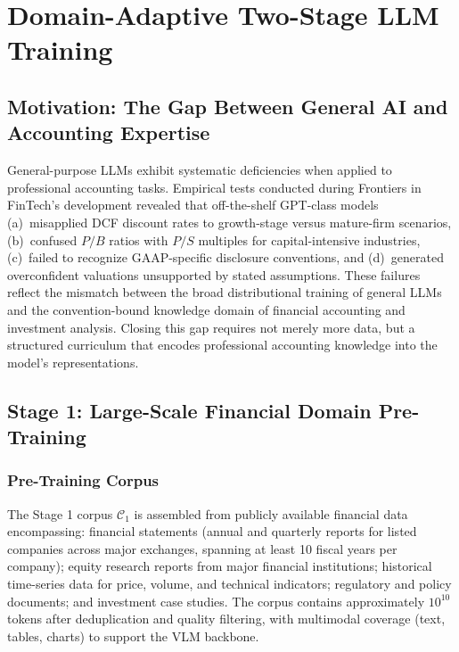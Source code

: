 \documentclass[12pt,letterpaper]{article}
\begin{document}
\section{Domain-Adaptive Two-Stage LLM Training}
\label{sec:innovation2}

\subsection{Motivation: The Gap Between General AI and Accounting Expertise}

General-purpose LLMs exhibit systematic deficiencies when applied to
professional accounting tasks.
Empirical tests conducted during Frontiers in FinTech's development revealed that
off-the-shelf GPT-class models (a)~misapplied DCF discount rates to
growth-stage versus mature-firm scenarios, (b)~confused $P/B$ ratios
with $P/S$ multiples for capital-intensive industries, (c)~failed to
recognize GAAP-specific disclosure conventions, and (d)~generated
overconfident valuations unsupported by stated assumptions.
These failures reflect the mismatch between the broad distributional
training of general LLMs and the convention-bound knowledge domain of
financial accounting and investment analysis.
Closing this gap requires not merely more data, but a structured
curriculum that encodes professional accounting knowledge into the
model's representations.

\subsection{Stage 1: Large-Scale Financial Domain Pre-Training}

\subsubsection{Pre-Training Corpus}

The Stage 1 corpus $\mathcal{C}_1$ is assembled from publicly available
financial data encompassing: financial statements (annual and quarterly
reports for listed companies across major exchanges, spanning at least
10 fiscal years per company); equity research reports from major
financial institutions; historical time-series data for price, volume,
and technical indicators; regulatory and policy documents; and
investment case studies.
The corpus contains approximately $10^{10}$ tokens after deduplication
and quality filtering, with multimodal coverage (text, tables, charts)
to support the VLM backbone.
\end{document}
